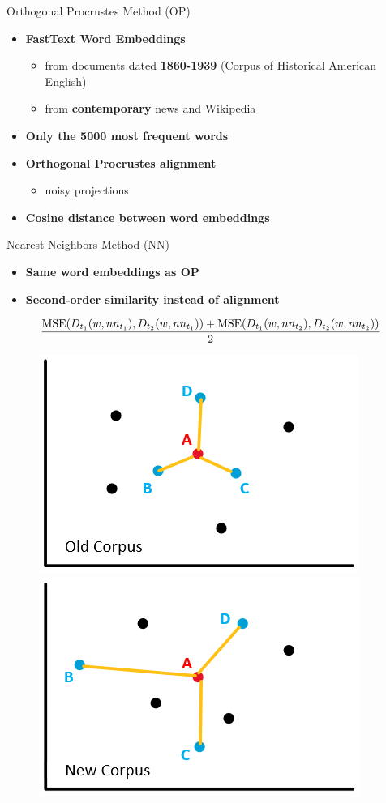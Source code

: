 \documentclass[10pt,aspectratio=1610,professionalfont]{beamer}
\begin{document}
\begin{frame}{Orthogonal Procrustes Method (OP)}
    \begin{itemize}
        \item \textbf{FastText Word Embeddings}
        \begin{itemize}
            \item from documents dated \textbf{1860-1939} (Corpus of Historical American English)
            \item from \textbf{contemporary} news and Wikipedia  
        \end{itemize}
        \item \textbf{Only the 5000 most frequent words}
        \item \textbf{Orthogonal Procrustes alignment}
        \begin{itemize}
            \item noisy projections 
        \end{itemize}
        \item \textbf{Cosine distance between word embeddings}
    \end{itemize}
\end{frame}

\begin{frame}{Nearest Neighbors Method (NN)}
    \begin{itemize}
        \item \textbf{Same word embeddings as OP}
        \item \textbf{Second-order similarity instead of alignment}
    \end{itemize}
    \vspace{10pt}
    \begin{equation}
        \frac{\text{MSE}(D_{t_1}(w, nn_{t_1}), D_{t_2}(w, nn_{t_1})) + \text{MSE}(D_{t_1}(w, nn_{t_2}), D_{t_2}(w, nn_{t_2}))}{2} \notag
    \end{equation}
    \vspace{-25pt}
    \begin{figure}
        \centering
        \subfloat
            {\includegraphics[width=.45\textwidth]{img/nn_1.png}} \quad
        \subfloat
            {\includegraphics[width=.45\textwidth]{img/nn_2.png}}
    \end{figure}
    
\end{frame}
\end{document}
